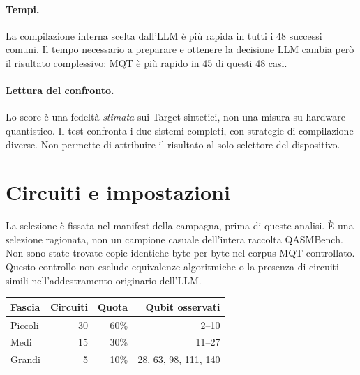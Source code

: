 \documentclass[11pt,a4paper]{article}
\begin{document}
\paragraph{Tempi.}
La compilazione interna scelta dall'LLM è più rapida in tutti i 48 successi comuni.
Il tempo necessario a preparare e ottenere la decisione LLM cambia però il risultato
complessivo: MQT è più rapido in 45 di questi 48 casi.
\paragraph{Lettura del confronto.}
Lo score è una fedeltà \emph{stimata} sui Target sintetici, non una misura su hardware quantistico.
Il test confronta i due sistemi completi, con strategie di compilazione diverse.
Non permette di attribuire il risultato al solo selettore del dispositivo.

\clearpage\section{Circuiti e impostazioni}

La selezione è fissata nel manifest della campagna, prima di queste analisi. È una
selezione ragionata, non un campione casuale dell'intera raccolta QASMBench.
Non sono state trovate copie identiche byte per byte nel corpus MQT controllato.
Questo controllo non esclude equivalenze algoritmiche o la presenza di circuiti simili
nell'addestramento originario dell'LLM.

\begin{center}
\small
\setlength{\tabcolsep}{5pt}
\begin{tabular}{lrrr}
\toprule
Fascia & Circuiti & Quota & Qubit osservati\\
\midrule
Piccoli & 30 & 60\% & 2--10\\
Medi & 15 & 30\% & 11--27\\
Grandi & 5 & 10\% & 28, 63, 98, 111, 140\\
\bottomrule
\end{tabular}\end{center}
\end{document}
